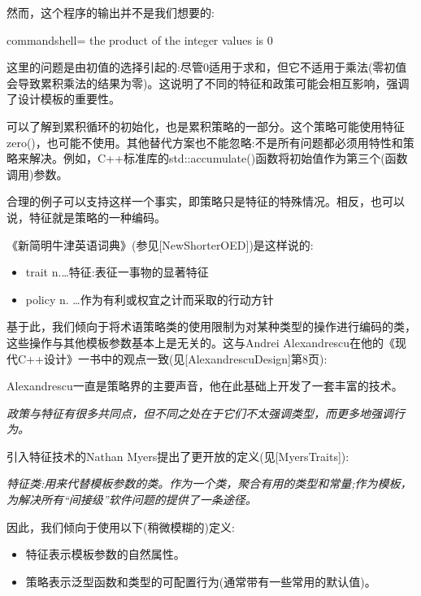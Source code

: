 然而，这个程序的输出并不是我们想要的:

\begin{tcblisting}{commandshell={}}
the product of the integer values is 0
\end{tcblisting}

这里的问题是由初值的选择引起的:尽管0适用于求和，但它不适用于乘法(零初值会导致累积乘法的结果为零)。这说明了不同的特征和政策可能会相互影响，强调了设计模板的重要性。

可以了解到累积循环的初始化，也是累积策略的一部分。这个策略可能使用特征zero()，也可能不使用。其他替代方案也不能忽略:不是所有问题都必须用特性和策略来解决。例如，C++标准库的std::accumulate()函数将初始值作为第三个(函数调用)参数。


合理的例子可以支持这样一个事实，即策略只是特征的特殊情况。相反，也可以说，特征就是策略的一种编码。

《新简明牛津英语词典》(参见[NewShorterOED])是这样说的:

\begin{itemize}
\item 
trait n.…特征:表征一事物的显著特征

\item 
policy n. …作为有利或权宜之计而采取的行动方针
\end{itemize}

基于此，我们倾向于将术语策略类的使用限制为对某种类型的操作进行编码的类，这些操作与其他模板参数基本上是无关的。这与Andrei Alexandrescu在他的《现代C++设计》一书中的观点一致(见[AlexandrescuDesign]第8页):

\begin{tcolorbox}[colback=webgreen!5!white,colframe=webgreen!75!black]
\hspace*{0.75cm}Alexandrescu一直是策略界的主要声音，他在此基础上开发了一套丰富的技术。
\end{tcolorbox}

\textit{政策与特征有很多共同点，但不同之处在于它们不太强调类型，而更多地强调行为。}

引入特征技术的Nathan Myers提出了更开放的定义(见[MyersTraits]):

\textit{特征类:用来代替模板参数的类。作为一个类，聚合有用的类型和常量;作为模板，为解决所有“间接级”软件问题的提供了一条途径。}

因此，我们倾向于使用以下(稍微模糊的)定义:

\begin{itemize}
\item 
特征表示模板参数的自然属性。

\item 
策略表示泛型函数和类型的可配置行为(通常带有一些常用的默认值)。
\end{itemize}

